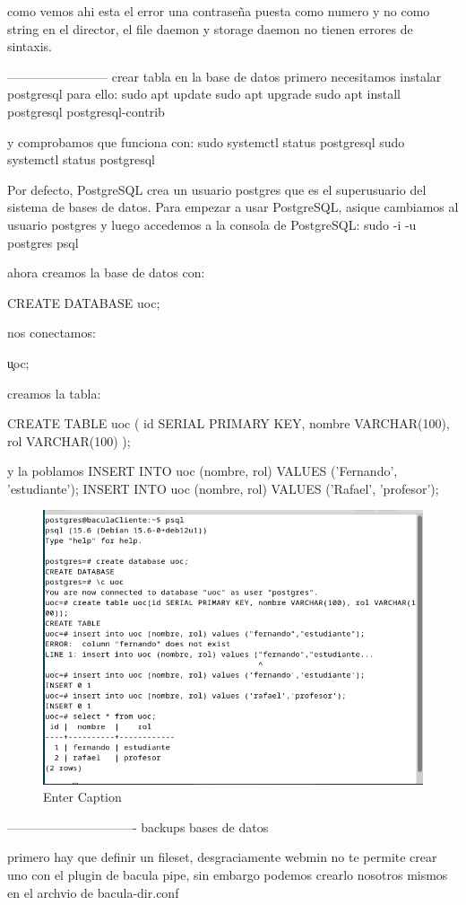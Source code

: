 como vemos ahi esta el error una contraseña puesta como numero y no como string en el director, el file daemon y storage daemon no tienen errores de sintaxis.


------------------------
crear tabla en la base de datos
primero necesitamos instalar postgresql para ello:
sudo apt update
sudo apt upgrade
sudo apt install postgresql postgresql-contrib

y comprobamos que funciona con:
sudo systemctl status postgresql
sudo systemctl status postgresql



Por defecto, PostgreSQL crea un usuario postgres que es el superusuario del sistema de bases de datos. Para empezar a usar PostgreSQL, asique cambiamos al usuario postgres y luego accedemos a la consola de PostgreSQL:
sudo -i -u postgres
psql


ahora creamos la base de datos con:

CREATE DATABASE uoc;

nos conectamos:

\c uoc;

creamos la tabla:

CREATE TABLE uoc (
    id SERIAL PRIMARY KEY,
    nombre VARCHAR(100),
    rol VARCHAR(100)
);

y la poblamos
INSERT INTO uoc (nombre, rol) VALUES ('Fernando', 'estudiante');
INSERT INTO uoc (nombre, rol) VALUES ('Rafael', 'profesor');

\begin{figure}[H]
    \centering
    \includegraphics[width=0.5\linewidth]{instalacionBacula/postgrestCrearTabla.png}
    \caption{Enter Caption}
\end{figure}

-------------------------------
backups bases de datos

primero hay que definir un fileset, desgraciamente webmin no te permite crear uno con el plugin de bacula pipe, sin embargo podemos crearlo nosotros mismos en el archvio de bacula-dir.conf

